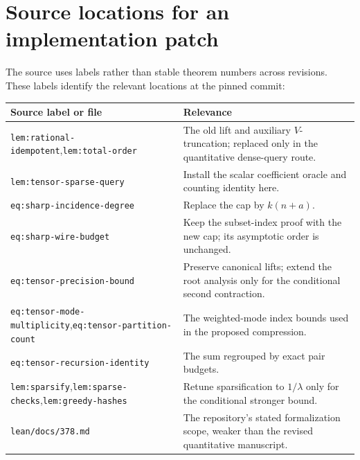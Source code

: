\documentclass[11pt]{article}
\theoremstyle{definition}
\theoremstyle{remark}
\begin{document}
\section{Source locations for an implementation patch}\label{app:locations}

The source uses labels rather than stable theorem numbers across revisions.
These labels identify the relevant locations at the pinned commit:
\begin{center}\small
\begin{tabularx}{\textwidth}{@{}p{}X@{}}
\toprule
Source label or file & Relevance \\
\midrule
\texttt{lem:rational-idempotent},\newline\texttt{lem:total-order} & The old lift and auxiliary $V$-truncation; replaced only in the quantitative dense-query route. \\
\texttt{lem:tensor-sparse-query} & Install the scalar coefficient oracle and counting identity here. \\
\texttt{eq:sharp-incidence-degree} & Replace the cap by $k(n+a)$. \\
\texttt{eq:sharp-wire-budget} & Keep the subset-index proof with the new cap; its asymptotic order is unchanged. \\
\texttt{eq:tensor-precision-bound} & Preserve canonical lifts; extend the root analysis only for the conditional second contraction. \\
\texttt{eq:tensor-mode-multiplicity},\newline\texttt{eq:tensor-partition-count} & The weighted-mode index bounds used in the proposed compression. \\
\texttt{eq:tensor-recursion-identity} & The sum regrouped by exact pair budgets. \\
\texttt{lem:sparsify},\newline\texttt{lem:sparse-checks},\newline\texttt{lem:greedy-hashes} & Retune sparsification to $1/\lambda$ only for the conditional stronger bound. \\
\texttt{lean/docs/378.md} & The repository's stated formalization scope, weaker than the revised quantitative manuscript. \\
\bottomrule
\end{tabularx}
\end{center}
\end{document}
